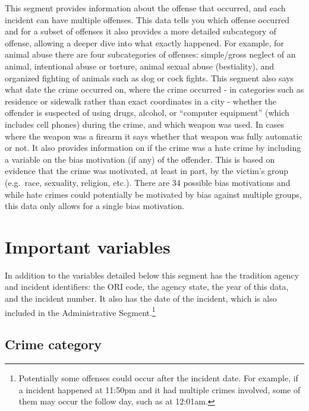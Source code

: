 \documentclass[
  12pt,
  openany]{book}
\begin{document}
This segment provides information about the offense that occurred, and each incident can have multiple offenses. This data tells you which offense occurred and for a subset of offenses it also provides a more detailed subcategory of offense, allowing a deeper dive into what exactly happened. For example, for animal abuse there are four subcategories of offenses: simple/gross neglect of an animal, intentional abuse or torture, animal sexual abuse (bestiality), and organized fighting of animals such as dog or cock fights. This segment also says what date the crime occurred on, where the crime occurred - in categories such as residence or sidewalk rather than exact coordinates in a city - whether the offender is suspected of using drugs, alcohol, or ``computer equipment'' (which includes cell phones) during the crime, and which weapon was used. In cases where the weapon was a firearm it says whether that weapon was fully automatic or not. It also provides information on if the crime was a hate crime by including a variable on the bias motivation (if any) of the offender. This is based on evidence that the crime was motivated, at least in part, by the victim's group (e.g.~race, sexuality, religion, etc.). There are 34 possible bias motivations and while hate crimes could potentially be motivated by bias against multiple groups, this data only allows for a single bias motivation.

\hypertarget{important-variables-1}{%
\section{Important variables}\label{important-variables-1}}

In addition to the variables detailed below this segment has the tradition agency and incident identifiers: the ORI code, the agency state, the year of this data, and the incident number. It also has the date of the incident, which is also included in the Administrative Segment.\footnote{Potentially some offenses could occur after the incident date. For example, if a incident happened at 11:50pm and it had multiple crimes involved, some of them may occur the follow day, such as at 12:01am.}

\hypertarget{crime-category}{%
\subsection{Crime category}\label{crime-category}}
\end{document}
